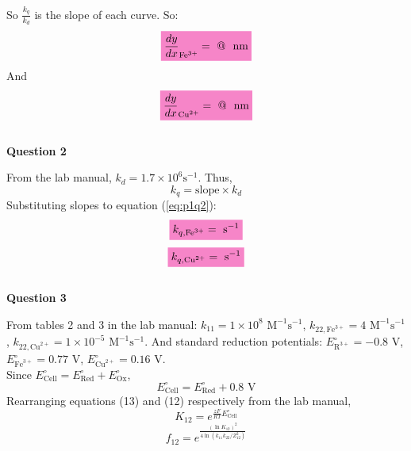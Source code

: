 So $\frac{k_q}{k_d}$ is the slope of each curve. So:
\begin{equation*}
    \mathcolorbox{Lavender}{\frac{dy}{dx}_{\text{Fe}^{3+}} =  \text{ @ }  \text{ nm} }
\end{equation*}
And
\begin{equation*}
    \mathcolorbox{Lavender}{\frac{dy}{dx}_{\text{Cu}^{2+}} =  \text{ @ }  \text{ nm} }
\end{equation*}
\\
\textbf{Question 2}
\par From the lab manual\autocite{lab_manual}, $k_d = 1.7 \times 10^6\text {s}^{-1}$. Thus,
\begin{equation}
    k_q = \text{slope} \times k_d
    \label{eq:p1q2}
\end{equation}
Substituting slopes to equation (\ref{eq:p1q2}):
\begin{equation*}
    \mathcolorbox{Lavender}{k_{q,\text{Fe}^{3+}} =  \text{ s}^{-1}}
\end{equation*}
\begin{equation*}
    \mathcolorbox{Lavender}{k_{q,\text{Cu}^{2+}} =  \text{ s}^{-1}}
\end{equation*}
\\
\textbf{Question 3}
\par From tables 2 and 3 in the lab manual\autocite{lab_manual}:
   $ k_{11} = 1 \times 10 ^ 8 \text{ M}^{-1}\text{s}^{-1}$, 
    $k_{22, \text{Fe}^{3+}} = 4 \text{ M}^{-1}\text{s}^{-1}$, 
    $k_{22, \text{Cu}^{2+}} = 1 \times 10 ^ {-5} \text{ M}^{-1}\text{s}^{-1}$. And standard reduction potentials: $E^{\circ}_{\text{R}^{3+}} = -0.8 \text{ V}$, $E^{\circ}_{\text{Fe}^{3+}} = 0.77 \text{ V}$, $E^{\circ}_{\text{Cu}^{2+}} = 0.16 \text{ V}$.
\\ Since $E^{\circ}_{\text{Cell}} = E^{\circ}_{\text{Red}} + E^{\circ}_{\text{Ox}}$, 
\begin{equation}
    E^{\circ}_{\text{Cell}} = E^{\circ}_{\text{Red}} + 0.8 \text{ V}
    \label{eq:ecell}
\end{equation}
Rearranging equations (13) and (12) respectively from the lab manual\autocite{lab_manual},
\begin{equation}
    K_{12} = e^{\frac{zF}{RT}E^{\circ}_{\text{Cell}}}
    \label{eq:K12}
\end{equation}
\begin{equation}
    f_{12} = e^{\frac{(\ln{K_{12}})^2}{4\ln{(k_{11}k_{22} / Z_{12}^2)}}}
    \label{eq:f12}
\end{equation}
